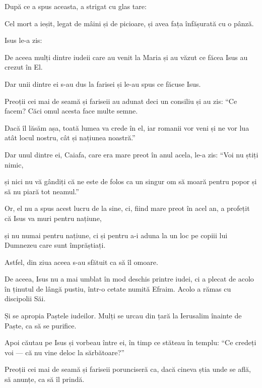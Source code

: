 {După ce a spus aceasta, a strigat cu glas tare:
{}


\par }{\PP {}Cel mort a ieșit, legat de mâini și de picioare, și avea fața înfășurată cu o pânză.

\par }{\PP Isus le-a zis:
{}


\par }{\PP {}De aceea mulți dintre iudeii care au venit la Maria și au văzut ce făcea Isus au crezut în El.

Dar unii dintre ei s-au dus la farisei și le-au spus ce făcuse Isus.

Preoții cei mai de seamă și fariseii au adunat deci un consiliu și au zis: “Ce facem? Căci omul acesta face multe semne.

Dacă îl lăsăm așa, toată lumea va crede în el, iar romanii vor veni și ne vor lua atât locul nostru, cât și națiunea noastră.”


\par }{\PP {}Dar unul dintre ei, Caiafa, care era mare preot în anul acela, le-a zis: “Voi nu știți nimic,

și nici nu vă gândiți că ne este de folos ca un singur om să moară pentru popor și să nu piară tot neamul.”

Or, el nu a spus acest lucru de la sine, ci, fiind mare preot în acel an, a profețit că Isus va muri pentru națiune,

și nu numai pentru națiune, ci și pentru a-i aduna la un loc pe copiii lui Dumnezeu care sunt împrăștiați.

Astfel, din ziua aceea s-au sfătuit ca să îl omoare.

De aceea, Isus nu a mai umblat în mod deschis printre iudei, ci a plecat de acolo în ținutul de lângă pustiu, într-o cetate numită Efraim. Acolo a rămas cu discipolii Săi.


\par }{\PP {}Și se apropia Paștele iudeilor. Mulți se urcau din țară la Ierusalim înainte de Paște, ca să se purifice.

Apoi căutau pe Isus și vorbeau între ei, în timp ce stăteau în templu: “Ce credeți voi — că nu vine deloc la sărbătoare?”

Preoții cei mai de seamă și fariseii porunciseră ca, dacă cineva știa unde se află, să anunțe, ca să îl prindă.



}
